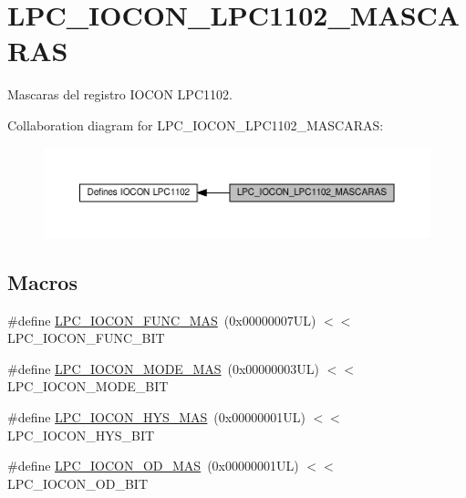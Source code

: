 \hypertarget{group___l_p_c___i_o_c_o_n___l_p_c1102___m_a_s_c_a_r_a_s}{}\section{L\+P\+C\+\_\+\+I\+O\+C\+O\+N\+\_\+\+L\+P\+C1102\+\_\+\+M\+A\+S\+C\+A\+R\+AS}
\label{group___l_p_c___i_o_c_o_n___l_p_c1102___m_a_s_c_a_r_a_s}


Mascaras del registro I\+O\+C\+ON L\+P\+C1102.  


Collaboration diagram for L\+P\+C\+\_\+\+I\+O\+C\+O\+N\+\_\+\+L\+P\+C1102\+\_\+\+M\+A\+S\+C\+A\+R\+AS\+:\nopagebreak
\begin{figure}[H]
\begin{center}
\leavevmode
\includegraphics[width=350pt]{group___l_p_c___i_o_c_o_n___l_p_c1102___m_a_s_c_a_r_a_s}
\end{center}
\end{figure}
\subsection*{Macros}
\begin{DoxyCompactItemize}
\item 
\#define \hyperlink{group___l_p_c___i_o_c_o_n___l_p_c1102___m_a_s_c_a_r_a_s_ga429d63df506589f85224d3c12fd61e3b}{L\+P\+C\+\_\+\+I\+O\+C\+O\+N\+\_\+\+F\+U\+N\+C\+\_\+\+M\+AS}~(0x00000007\+U\+L) $<$$<$ L\+P\+C\+\_\+\+I\+O\+C\+O\+N\+\_\+\+F\+U\+N\+C\+\_\+\+B\+IT
\item 
\#define \hyperlink{group___l_p_c___i_o_c_o_n___l_p_c1102___m_a_s_c_a_r_a_s_gac56363757324c51a61e36e9471024b05}{L\+P\+C\+\_\+\+I\+O\+C\+O\+N\+\_\+\+M\+O\+D\+E\+\_\+\+M\+AS}~(0x00000003\+U\+L) $<$$<$ L\+P\+C\+\_\+\+I\+O\+C\+O\+N\+\_\+\+M\+O\+D\+E\+\_\+\+B\+IT
\item 
\#define \hyperlink{group___l_p_c___i_o_c_o_n___l_p_c1102___m_a_s_c_a_r_a_s_ga0f8ccfc34bf41c0deced30305a2d17e5}{L\+P\+C\+\_\+\+I\+O\+C\+O\+N\+\_\+\+H\+Y\+S\+\_\+\+M\+AS}~(0x00000001\+U\+L) $<$$<$ L\+P\+C\+\_\+\+I\+O\+C\+O\+N\+\_\+\+H\+Y\+S\+\_\+\+B\+IT
\item 
\#define \hyperlink{group___l_p_c___i_o_c_o_n___l_p_c1102___m_a_s_c_a_r_a_s_ga63379280f01e70a858b26114f4949794}{L\+P\+C\+\_\+\+I\+O\+C\+O\+N\+\_\+\+O\+D\+\_\+\+M\+AS}~(0x00000001\+U\+L) $<$$<$ L\+P\+C\+\_\+\+I\+O\+C\+O\+N\+\_\+\+O\+D\+\_\+\+B\+IT
\end{DoxyCompactItemize}


